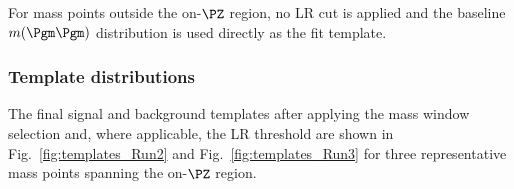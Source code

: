 \begin{table}[htbp]
  \centering
  \caption{Optimized modified LR thresholds for on-$\PZ$ signal mass points. The thresholds are optimized separately for Run 2 and Run 3 and for the $\Pe\Pgm\Pgm$ and $\Pgm\Pgm\Pgm$ signal regions. The improvement column gives the range of relative expected significance gains across the four optimized categories.}
  \label{tab:LR_thresholds}
\end{table}

For mass points outside the on-$\PZ$ region, no LR cut is applied and the baseline $m(\Pgm\Pgm)$ distribution is used directly as the fit template.

\subsubsection{Template distributions}

The final signal and background templates after applying the mass window selection and, where applicable, the LR threshold are shown in Fig.~\ref{fig:templates_Run2} and Fig.~\ref{fig:templates_Run3} for three representative mass points spanning the on-$\PZ$ region.

